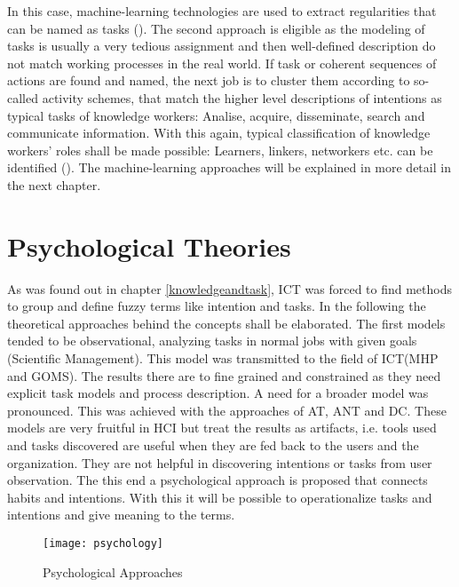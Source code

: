 In this case, machine-learning technologies are used to extract regularities that can be named as tasks (\cite{schmitz2011contextualized}). The second approach is eligible as the modeling of tasks is usually a very tedious assignment and then well-defined description do not match working processes in the real world. If task or coherent sequences of actions are found and named, the next job is to cluster them according to so-called activity schemes, that match the higher level descriptions of intentions as typical tasks of knowledge workers: Analise, acquire, disseminate, search and communicate information. With this again, typical classification of knowledge workers' roles shall be made possible: Learners, linkers, networkers etc. can be identified (\cite{reinhardt2011knowledge}). The machine-learning approaches will be explained in more detail in the next chapter. 

\section{Psychological Theories}
As was found out in chapter \ref{knowledgeandtask}, \acs{ICT} was forced to find methods to group and define fuzzy terms like intention and tasks. In the following the theoretical approaches behind the concepts shall be elaborated. The first models tended to be observational, analyzing tasks in normal jobs with given goals (Scientific Management). This model was transmitted to the field of \acs{ICT}(MHP and GOMS). The results there are to fine grained and constrained as they need explicit task models and process description. A need for a broader model was pronounced. This was achieved with the approaches of \ac{AT}, \ac{ANT} and \ac{DC}. These models are very fruitful in \ac{HCI} but treat the results as artifacts, i.e. tools used and tasks discovered are useful when they are fed back to the users and the organization. They are not helpful in discovering intentions or tasks from user observation. The this end a psychological approach is proposed that connects habits and intentions. With this it will be possible to operationalize tasks and intentions and give meaning to the terms.

\begin{figure}[ht]
	\centering
  \texttt{[image: psychology]}
	\caption{Psychological Approaches}
	\label{fig2}
\end{figure}


